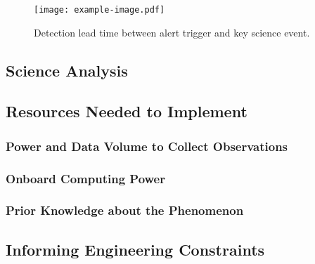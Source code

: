 \begin{figure}
    \centering
    \texttt{[image: example-image.pdf]}
    \caption{Detection lead time between alert trigger and key science event.}
    \label{fig:detection_timing}
\end{figure}

\subsection{Science Analysis}

\subsection{Resources Needed to Implement}
\subsubsection{Power and Data Volume to Collect Observations}
\subsubsection{Onboard Computing Power}
\subsubsection{Prior Knowledge about the Phenomenon}


\subsection{Informing Engineering Constraints}
